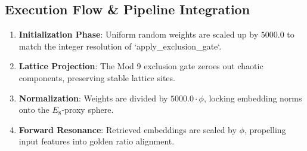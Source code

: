 \subsection{Execution Flow \& Pipeline Integration}
\begin{enumerate}
    \item \textbf{Initialization Phase}: Uniform random weights are scaled up by $5000.0$ to match the integer resolution of `apply_exclusion_gate`.
    \item \textbf{Lattice Projection}: The Mod 9 exclusion gate zeroes out chaotic components, preserving stable lattice sites.
    \item \textbf{Normalization}: Weights are divided by $5000.0 \cdot \phi$, locking embedding norms onto the $E_8$-proxy sphere.
    \item \textbf{Forward Resonance}: Retrieved embeddings are scaled by $\phi$, propelling input features into golden ratio alignment.
\end{enumerate}
